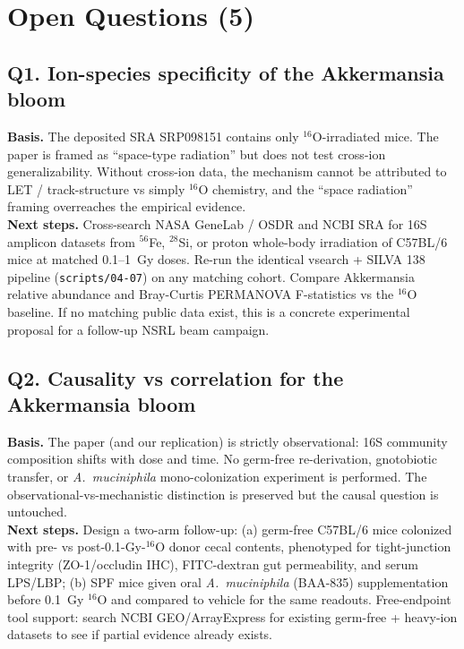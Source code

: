 \section{Open Questions (5)}

\subsection*{Q1. Ion-species specificity of the Akkermansia bloom}
\textbf{Basis.} The deposited SRA SRP098151 contains only $^{16}$O-irradiated mice. The paper is framed as ``space-type radiation'' but does not test cross-ion generalizability. Without cross-ion data, the mechanism cannot be attributed to LET / track-structure vs simply $^{16}$O chemistry, and the ``space radiation'' framing overreaches the empirical evidence. \\
\textbf{Next steps.} Cross-search NASA GeneLab / OSDR and NCBI SRA for 16S amplicon datasets from $^{56}$Fe, $^{28}$Si, or proton whole-body irradiation of C57BL/6 mice at matched 0.1--1~Gy doses. Re-run the identical vsearch + SILVA 138 pipeline (\texttt{scripts/04-07}) on any matching cohort. Compare Akkermansia relative abundance and Bray-Curtis PERMANOVA F-statistics vs the $^{16}$O baseline. If no matching public data exist, this is a concrete experimental proposal for a follow-up NSRL beam campaign.

\subsection*{Q2. Causality vs correlation for the Akkermansia bloom}
\textbf{Basis.} The paper (and our replication) is strictly observational: 16S community composition shifts with dose and time. No germ-free re-derivation, gnotobiotic transfer, or \emph{A.~muciniphila} mono-colonization experiment is performed. The observational-vs-mechanistic distinction is preserved but the causal question is untouched. \\
\textbf{Next steps.} Design a two-arm follow-up: (a) germ-free C57BL/6 mice colonized with pre- vs post-0.1-Gy-$^{16}$O donor cecal contents, phenotyped for tight-junction integrity (ZO-1/occludin IHC), FITC-dextran gut permeability, and serum LPS/LBP; (b) SPF mice given oral \emph{A.~muciniphila} (BAA-835) supplementation before 0.1~Gy $^{16}$O and compared to vehicle for the same readouts. Free-endpoint tool support: search NCBI GEO/ArrayExpress for existing germ-free + heavy-ion datasets to see if partial evidence already exists.

